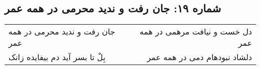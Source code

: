 \begin{center}
\section*{شماره ۱۹: جان رفت و ندید محرمی در همه عمر}
\label{sec:019}
\begin{longtable}{l p{0.5cm} r}
جان رفت و ندید محرمی در همه عمر
&&
دل خست و نیافت مرهمی در همه عمر
\\
بِلْ تا بسر آید دم بیفایده زانک
&&
دلشاد نبودهام دمی در همه عمر
\\
\end{longtable}
\end{center}
